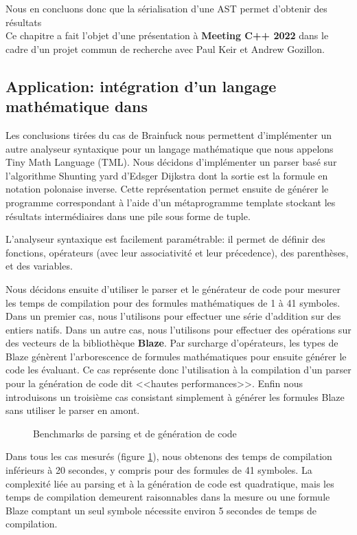 \documentclass[main]{subfiles}
\begin{document}
Nous en concluons donc que la s\'erialisation d'une AST permet d'obtenir des
r\'esultats
\\

Ce chapitre a fait l'objet d'une pr\'esentation \`a \textbf{Meeting C++ 2022}
dans le cadre d'un projet commun de recherche avec Paul Keir et Andrew Gozillon.

\subsection*{
  Application: int\'egration d'un langage math\'ematique dans \cpp
}

Les conclusions tir\'ees du cas de Brainfuck nous permettent d'impl\'ementer
un autre analyseur syntaxique pour un langage math\'ematique que nous appelons
Tiny Math Language (TML). Nous d\'ecidons d'impl\'ementer un parser bas\'e sur
l'algorithme Shunting yard d'Edsger Dijkstra dont la sortie est la formule
en notation polonaise inverse. Cette repr\'esentation permet ensuite de
g\'en\'erer le programme correspondant \`a l'aide d'un m\'etaprogramme template
stockant les r\'esultats interm\'ediaires dans une pile sous forme de tuple.

L'analyseur syntaxique est facilement param\'etrable: il permet de d\'efinir des
fonctions, op\'erateurs (avec leur associativit\'e et leur pr\'ecedence),
des parenth\`eses, et des variables.

Nous d\'ecidons ensuite d'utiliser le parser et le g\'en\'erateur de code
pour mesurer les temps de compilation pour des formules math\'ematiques
de 1 \`a 41 symboles. Dans un premier cas, nous l'utilisons pour effectuer une
s\'erie d'addition sur des entiers natifs.
Dans un autre cas, nous l'utilisons pour effectuer des op\'erations sur des
vecteurs de la biblioth\`eque \textbf{Blaze}. Par surcharge d'op\'erateurs,
les types de Blaze g\'en\`erent l'arborescence de formules math\'ematiques
pour ensuite g\'en\'erer le code les \'evaluant. Ce cas repr\'esente donc
l'utilisation \`a la compilation d'un parser pour la g\'en\'eration de code dit
<<hautes performances>>.
Enfin nous introduisons un troisi\`eme cas consistant simplement \`a
g\'en\'erer les formules Blaze sans utiliser le parser en amont.

\begin{figure}[h]

\caption{Benchmarks de parsing et de g\'en\'eration de code}
\label{fig:tml-ctbench-fr}
\end{figure}

Dans tous les cas mesur\'es (figure \ref{fig:tml-ctbench-fr}), nous obtenons
des temps de compilation inf\'erieurs \`a 20 secondes, y compris pour des
formules de 41 symboles.
La complexit\'e  li\'ee au parsing et \`a la g\'en\'eration de code
est quadratique, mais les temps de compilation demeurent raisonnables
dans la mesure ou une formule Blaze comptant un seul symbole n\'ecessite
environ 5 secondes de temps de compilation.
\end{document}
